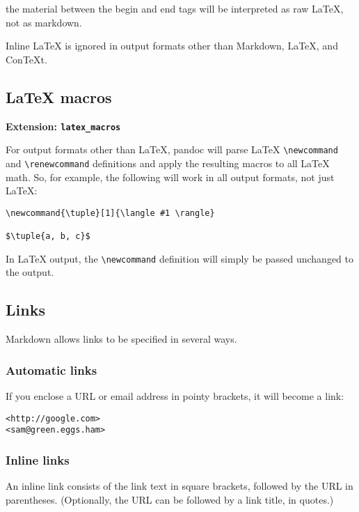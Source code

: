 \documentclass[]{article}
\begin{document}
the material between the begin and end tags will be interpreted as raw
LaTeX, not as markdown.

Inline LaTeX is ignored in output formats other than Markdown, LaTeX,
and ConTeXt.

\subsection{LaTeX macros}

\textbf{Extension: \texttt{latex\_macros}}

For output formats other than LaTeX, pandoc will parse LaTeX
\texttt{\textbackslash{}newcommand} and
\texttt{\textbackslash{}renewcommand} definitions and apply the
resulting macros to all LaTeX math. So, for example, the following will
work in all output formats, not just LaTeX:

\begin{verbatim}
\newcommand{\tuple}[1]{\langle #1 \rangle}

$\tuple{a, b, c}$
\end{verbatim}

In LaTeX output, the \texttt{\textbackslash{}newcommand} definition will
simply be passed unchanged to the output.

\subsection{Links}

Markdown allows links to be specified in several ways.

\subsubsection{Automatic links}

If you enclose a URL or email address in pointy brackets, it will become
a link:

\begin{verbatim}
<http://google.com>
<sam@green.eggs.ham>
\end{verbatim}

\subsubsection{Inline links}

An inline link consists of the link text in square brackets, followed by
the URL in parentheses. (Optionally, the URL can be followed by a link
title, in quotes.)
\end{document}
